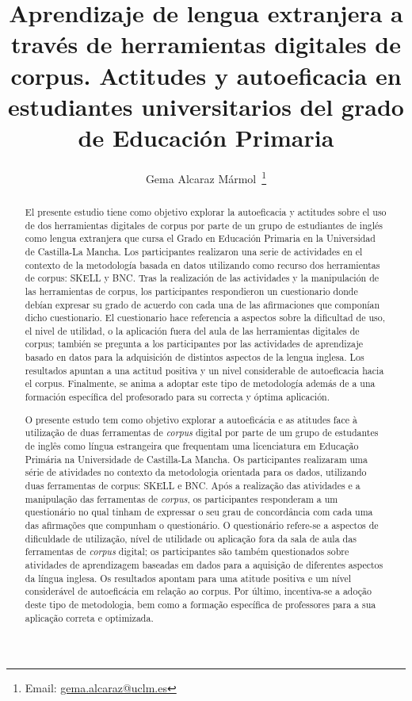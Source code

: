 \documentclass[spanish]{textolivre}
\title{Aprendizaje de lengua extranjera a través de herramientas digitales de corpus. Actitudes y autoeficacia en estudiantes universitarios del grado de Educación Primaria}
\author[1]{Gema Alcaraz Mármol~\orcid{0000-0001-7703-3829}\thanks{Email: \href{mailto:gema.alcaraz@uclm.es}{gema.alcaraz@uclm.es}}}
\affil[1]{Universidad de Castilla-La Mancha,  Departamento de Filología Moderna, Toledo, España.}
\begin{document}
\maketitle
\begin{polyabstract}
\begin{abstract}
El presente estudio tiene como objetivo explorar la
autoeficacia y actitudes sobre el uso de dos herramientas digitales de
corpus por parte de un grupo de estudiantes de inglés como lengua
extranjera que cursa el Grado en Educación Primaria en la Universidad de
Castilla-La Mancha. Los participantes realizaron una serie de
actividades en el contexto de la metodología basada en datos utilizando
como recurso dos herramientas de corpus: SKELL y BNC. Tras la
realización de las actividades y la manipulación de las herramientas de
corpus, los participantes respondieron un cuestionario donde debían
expresar su grado de acuerdo con cada una de las afirmaciones que
componían dicho cuestionario. El cuestionario hace referencia a aspectos
sobre la dificultad de uso, el nivel de utilidad, o la aplicación fuera
del aula de las herramientas digitales de corpus; también se pregunta a
los participantes por las actividades de aprendizaje basado en datos
para la adquisición de distintos aspectos de la lengua inglesa. Los
resultados apuntan a una actitud positiva y un nivel considerable de
autoeficacia hacia el corpus. Finalmente, se anima a adoptar este tipo
de metodología además de a una formación específica del profesorado para
su correcta y óptima aplicación.

\end{abstract}

\begin{portuguese}
\begin{abstract}
O presente estudo tem como objetivo explorar a autoeficácia e
as atitudes face à utilização de duas ferramentas de \textit{corpus} digital por parte de um grupo de estudantes de inglês como língua estrangeira que
frequentam uma licenciatura em Educação Primária na Universidade de
Castilla-La Mancha. Os participantes realizaram uma série de atividades
no contexto da metodologia orientada para os dados, utilizando duas
ferramentas de corpus: SKELL e BNC. Após a realização das atividades e
a manipulação das ferramentas de \textit{corpus}, os participantes responderam a um questionário no qual tinham de expressar o seu grau de concordância com cada uma das afirmações que compunham o questionário. O questionário refere-se a aspectos de dificuldade de utilização, nível de utilidade ou aplicação fora da sala de aula das ferramentas de \textit{corpus} digital; os participantes são também questionados sobre atividades de aprendizagem baseadas em dados para a aquisição de diferentes aspectos da língua inglesa. Os resultados apontam para uma atitude positiva e um nível considerável de autoeficácia em relação ao corpus. Por último,
incentiva-se a adoção deste tipo de metodologia, bem como a formação
específica de professores para a sua aplicação correta e optimizada.


\end{abstract}
\end{portuguese}
\end{polyabstract}
\end{document}
